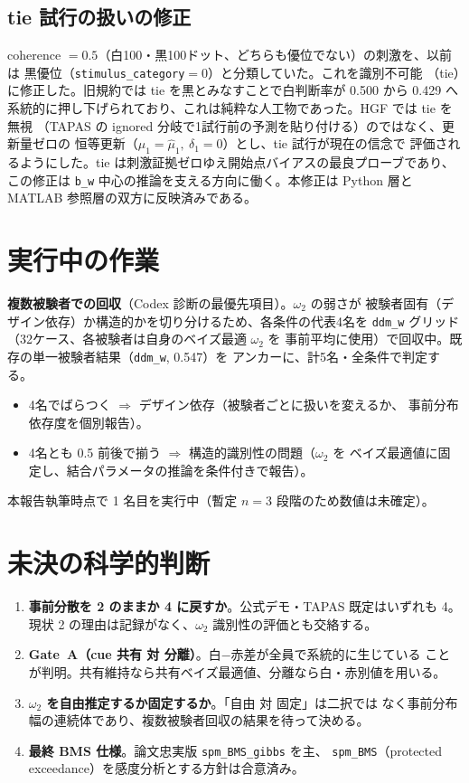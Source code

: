 \documentclass[11pt]{ltjsarticle}
\newcommand{\code}[1]{\texttt{#1}}
\begin{document}
\subsection{tie 試行の扱いの修正}
\label{sec:tie}

coherence \(=0.5\)（白100・黒100ドット、どちらも優位でない）の刺激を、以前は
黒優位（\code{stimulus\_category}\(=0\)）と分類していた。これを識別不可能
（tie）に修正した。旧規約では tie を黒とみなすことで白判断率が 0.500 から 0.429 へ
系統的に押し下げられており、これは純粋な人工物であった。HGF では tie を無視
（TAPAS の ignored 分岐で1試行前の予測を貼り付ける）のではなく、更新量ゼロの
恒等更新（\(\mu_1 = \hat\mu_1,\ \delta_1 = 0\)）とし、tie 試行が現在の信念で
評価されるようにした。tie は刺激証拠ゼロゆえ開始点バイアスの最良プローブであり、
この修正は \code{b\_w} 中心の推論を支える方向に働く。本修正は Python 層と MATLAB
参照層の双方に反映済みである。

\section{実行中の作業}

\textbf{複数被験者での回収}（Codex 診断の最優先項目）。\(\omega_2\) の弱さが
被験者固有（デザイン依存）か構造的かを切り分けるため、各条件の代表4名を
\code{ddm\_w} グリッド（32ケース、各被験者は自身のベイズ最適 \(\omega_2\) を
事前平均に使用）で回収中。既存の単一被験者結果（\code{ddm\_w}, 0.547）を
アンカーに、計5名・全条件で判定する。
\begin{itemize}[leftmargin=1.4em]
  \item 4名でばらつく \(\Rightarrow\) デザイン依存（被験者ごとに扱いを変えるか、
        事前分布依存度を個別報告）。
  \item 4名とも 0.5 前後で揃う \(\Rightarrow\) 構造的識別性の問題（\(\omega_2\) を
        ベイズ最適値に固定し、結合パラメータの推論を条件付きで報告）。
\end{itemize}
本報告執筆時点で 1 名目を実行中（暫定 \(n=3\) 段階のため数値は未確定）。

\section{未決の科学的判断}

\begin{enumerate}[leftmargin=1.4em]
  \item \textbf{事前分散を 2 のままか 4 に戻すか}。公式デモ・TAPAS 既定はいずれも 4。
        現状 2 の理由は記録がなく、\(\omega_2\) 識別性の評価とも交絡する。
  \item \textbf{Gate~A（cue 共有 対 分離）}。白\(-\)赤差が全員で系統的に生じている
        ことが判明。共有維持なら共有ベイズ最適値、分離なら白・赤別値を用いる。
  \item \textbf{\(\omega_2\) を自由推定するか固定するか}。「自由 対 固定」は二択では
        なく事前分布幅の連続体であり、複数被験者回収の結果を待って決める。
  \item \textbf{最終 BMS 仕様}。論文忠実版 \code{spm\_BMS\_gibbs} を主、
        \code{spm\_BMS}（protected exceedance）を感度分析とする方針は合意済み。
\end{enumerate}
\end{document}
